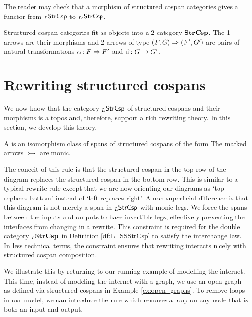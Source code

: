 \documentclass{amsart}
\begin{document}
The reader may check that a morphism of structured cospan
categories gives a functor from $_L\mathsf{StrCsp} $ to
$ _{L'}\mathsf{StrCsp} $. 

Structured cospan categories fit as objects into a
2-category $ \mathbf{StrCsp} $. The 1-arrows are their morphisms
and 2-arrows of type $ (F,G) \Rightarrow (F',G') $ are pairs of
natural transformations $ \alpha \colon F \Rightarrow F' $ and
$ \beta \colon G \to G'$.


\section{Rewriting structured cospans}
\label{sec:RewritingStrCsp}

We now know that the category $ _L\mathsf{StrCsp} $ of
structured cospans and their morphisms is a topos
and, therefore, support a rich rewriting
theory. In this section, we develop this theory.

\begin{definition}
  A  is an
  isomorphism class of spans of structured cospans of the
  form  The marked arrows $ \rightarrowtail $ are
  monic.
\end{definition}

The conceit of this rule is that the structured
cospan in the top row of the diagram replaces the
structured cospan in the bottom row. This is
similar to a typical rewrite rule except that we
are now orienting our diagrams as
`top-replaces-bottom' instead of
`left-replaces-right'.  A non-superficial
difference is that this diagram is not merely a
span in $ _L\mathsf{StrCsp} $ with monic legs.  We force
the spans between the inputs and outputs to have
invertible legs, effectively preventing the
interfaces from changing in a rewrite.  This
constraint is required for the double category
$ _L\mathbb{S} \mathbf{trCsp} $ in Definition \ref{df:L_SSStrCsp}
to satisfy the interchange law. In less technical
terms, the constraint ensures that rewriting interacts nicely
with structured cospan composition.

\begin{example}
  We illustrate this by returning to our running
  example of modelling the internet. This time,
  instead of modeling the internet with a graph,
  we use an open graph as defined via structured
  cospans in Example \ref{ex:open_graphs}. To
  remove loops in our model, we can introduce the
  rule  which
  removes a loop on any node that is both an input
  and output.
\end{example}
\end{document}
